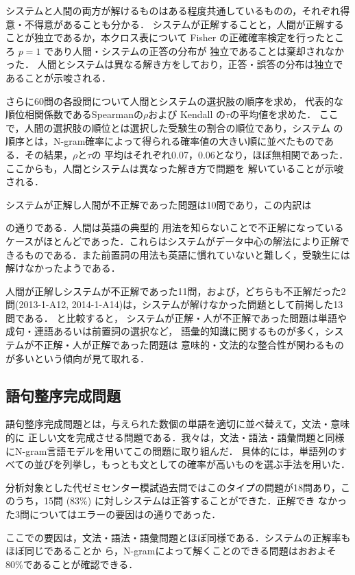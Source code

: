 \documentclass[japanese]{jnlp_1.4b}
\def\TABREF#1{}
\begin{document}
システムと人間の両方が解けるものはある程度共通しているものの，それぞれ得意・不得意があることも分かる．
システムが正解することと，人間が正解することが独立であるか，本クロス表について
Fisher の正確確率検定を行ったところ $p=1$ であり人間・システムの正答の分布が
独立であることは棄却されなかった．
人間とシステムは異なる解き方をしており，正答・誤答の分布は独立であることが示唆される．

さらに60問の各設問について人間とシステムの選択肢の順序を求め，
代表的な順位相関係数であるSpearmanの$\rho$および Kendall の$\tau$の平均値を求めた．
ここで，人間の選択肢の順位とは選択した受験生の割合の順位であり，システム
の順序とは，N-gram確率によって得られる確率値の大きい順に並べたものである．その結果，$\rho$と$\tau$の
平均はそれぞれ0.07，0.06となり，ほぼ無相関であった．ここからも，人間とシステムは異なった解き方で問題を
解いていることが示唆される．

システムが正解し人間が不正解であった問題は10問であり，この内訳は
\TABREF{tab:eigo:syshumcompare}
の通りである．人間は英語の典型的
用法を知らないことで不正解になっているケースがほとんどであった．これらはシステムがデータ中心の解法により正解で
きるものである．また前置詞の用法も英語に慣れていないと難しく，受験生には解けなかったようである．

人間が正解しシステムが不正解であった11問，および，どちらも不正解だった2問(2013-1-A12,
2014-1-A14)は，システムが解けなかった問題として前掲した13問である．
\TABREF{tab:eigo:syshumcompare}と比較すると，
システムが正解・人が不正解であった問題は単語や成句・連語あるいは前置詞の選択など，
語彙的知識に関するものが多く，システムが不正解・人が正解であった問題は
意味的・文法的な整合性が関わるものが多いという傾向が見て取れる．


\subsection{語句整序完成問題}
\label{sec:eigo:2c}

語句整序完成問題とは，与えられた数個の単語を適切に並べ替えて，文法・意味的に
正しい文を完成させる問題である．我々は，文法・語法・語彙問題と同様にN-gram言語モデルを用いてこの問題に取り組んだ．
具体的には，単語列のすべての並びを列挙し，もっとも文としての確率が高いものを選ぶ手法を用いた．

分析対象とした代ゼミセンター模試過去問ではこのタイプの問題が18問あり，このうち，15問 (83\%) に対しシステムは正答することができた．正解でき
なかった3問についてはエラーの要因は\TABREF{tab:eigo:error:sort}の通りであった．

ここでの要因は，文法・語法・語彙問題とほぼ同様である．システムの正解率もほぼ同じであることか
ら，N-gramによって解くことのできる問題はおおよそ80\%であることが確認できる．
\end{document}

